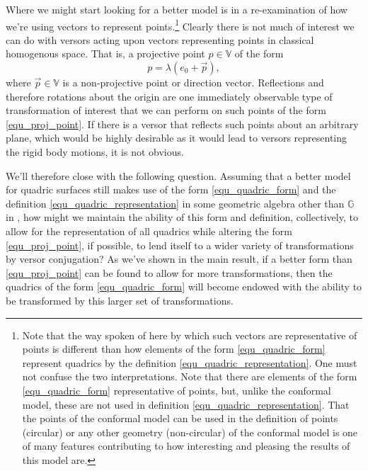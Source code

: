 \documentclass{birkjour}
\theoremstyle{definition}
\theoremstyle{remark}
\numberwithin{equation}{section}
\newcommand{\G}{\mathbb{G}}
\newcommand{\V}{\mathbb{V}}
\begin{document}
Where we might start looking for a better model is in a re-examination of how we're using
vectors to represent points.\footnote{Note that the way spoken of here by which such vectors are
representative of points is different than how elements of the form \eqref{equ_quadric_form}
represent quadrics by the definition \eqref{equ_quadric_representation}.  One must not
confuse the two interpretations.  Note that there are elements of the form \eqref{equ_quadric_form}
representative of points, but, unlike the conformal model, these are not used in definition
\eqref{equ_quadric_representation}.  That the points of the conformal model can be used
in the definition of points (circular) or any other geometry (non-circular) of the conformal model is one of many
features contributing to how interesting and pleasing the results of this model are.}
Clearly there is not much of interest we can do with versors acting
upon vectors representing points in classical homogenous space.  That is, a projective point $p\in\V$
of the form
\begin{equation}\label{equ_proj_point}
p = \lambda(e_0 + \vec{p}),
\end{equation}
where $\vec{p}\in\V$ is a non-projective point or direction vector.  Reflections and therefore rotations
about the origin are one immediately observable type of transformation of interest
that we can perform on such points of the form \eqref{equ_proj_point}.
If there is a versor that reflects such points about
an arbitrary plane, which would be highly desirable as it would lead to versors
representing the rigid body motions, it is not obvious.

We'll therefore close with the following question.
Assuming that a better model for quadric surfaces still makes use of the form \eqref{equ_quadric_form} and
the definition \eqref{equ_quadric_representation} in some geometric algebra other than $\G$
in \cite{Parkin12}, how might we maintain the ability of this form and definition, collectively,
to allow for the representation of all quadrics while altering the form \eqref{equ_proj_point},
if possible, to lend itself to a wider variety of transformations by versor conjugation?  As we've
shown in the main result, if a better form than \eqref{equ_proj_point} can be found to
allow for more transformations, then
the quadrics of the form \eqref{equ_quadric_form} will become endowed with the ability
to be transformed by this larger set of transformations.
\pagebreak



\end{document}
